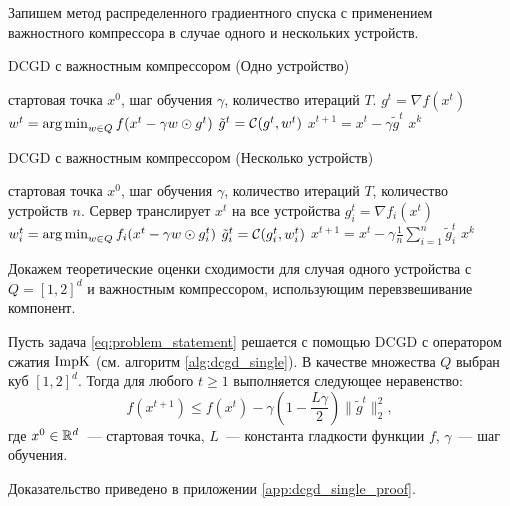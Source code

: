     Запишем метод распределенного градиентного спуска с применением важностного компрессора в случае одного и нескольких устройств.
    \begin{algorithm}[ht]
        \caption{DCGD с важностным компрессором (Одно устройство)}
        \label{alg:dcgd_single}
        \begin{algorithmic}
             стартовая точка $x^0$, шаг обучения $\gamma$, количество итераций $T$.
                \STATE $g^t = \nabla f(x^t)$
                \STATE $w^t = \operatorname*{arg\,min}_{w \in Q} f(x^t - \gamma w \odot g^t)$
                \STATE $\tilde{g}^t = {\cal C}(g^t, w^t)$
                \STATE $x^{t+1} = x^t - \gamma \tilde{g}^t$
            \ENDFOR
             $x^k$
        \end{algorithmic}
    \end{algorithm}

    \begin{algorithm}[h]
        \caption{DCGD с важностным компрессором (Несколько устройств)}
        \label{alg:dcgd_multi}
        \begin{algorithmic}[1]
             стартовая точка $x^0$, шаг обучения $\gamma$, количество итераций $T$, количество устройств $n$.
                \STATE Сервер транслирует $x^t$ на все устройства
                    \STATE $g_i^t = \nabla f_i(x^t)$
                    \STATE $w_i^t = \operatorname*{arg\,min}_{w \in Q} f_i(x^t - \gamma w \odot g_i^t)$
                    \STATE $\tilde{g}_i^t = {\cal C}(g_i^t, w_i^t)$
                \ENDFOR
                \STATE $x^{t+1} = x^t - \gamma \frac{1}{n} \sum\limits_{i=1}^n \tilde{g}_i^t$
            \ENDFOR
             $x^k$
        \end{algorithmic}
    \end{algorithm}

    Докажем теоретические оценки сходимости для случая одного устройства с $Q = [1, 2]^d$ и важностным компрессором, использующим перевзвешивание компонент.

    \begin{theorem}\label{th:dcgd_single}
        Пусть задача \eqref{eq:problem_statement} решается с помощью DCGD с оператором сжатия $\operatorname{ImpK}$ (см. алгоритм \ref{alg:dcgd_single}). В качестве множества $Q$ выбран куб $[1, 2]^d$. Тогда для любого $t \geq 1$ выполняется следующее неравенство:
        \begin{equation}
            f(x^{t + 1}) \leq f(x^t) - \gamma \left(1 - \frac{L \gamma}{2}\right) \|\tilde{g}^t\|_2^2,
        \end{equation}
        где $x^0 \in \mathbb{R}^d$~--- стартовая точка, $L$~--- константа гладкости функции $f$, $\gamma$~--- шаг обучения.
    \end{theorem}
    Доказательство приведено в приложении \ref{app:dcgd_single_proof}.

